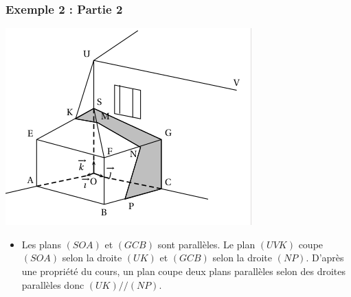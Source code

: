 \documentclass[xcolor=svgnames,t,final]{beamer}
\begin{document}
\begin{frame}

\frametitle{Exemple 2 : Partie 2}


\begin{center}
\includegraphics[scale=0.25]{images/exemple2.png}
\end{center}

\begin{itemize}
\pause \item {\color{blue}   Les plans $(SOA)$ et $(GCB)$ sont parallèles. Le plan $(UVK)$ coupe $(SOA)$ selon la droite  $(UK)$ et $(GCB)$ selon la droite $(NP)$. D'après une propriété du cours, un plan coupe deux plans parallèles selon des droites parallèles donc $(UK)//(NP)$.}
\end{itemize}
\end{frame}
\end{document}
